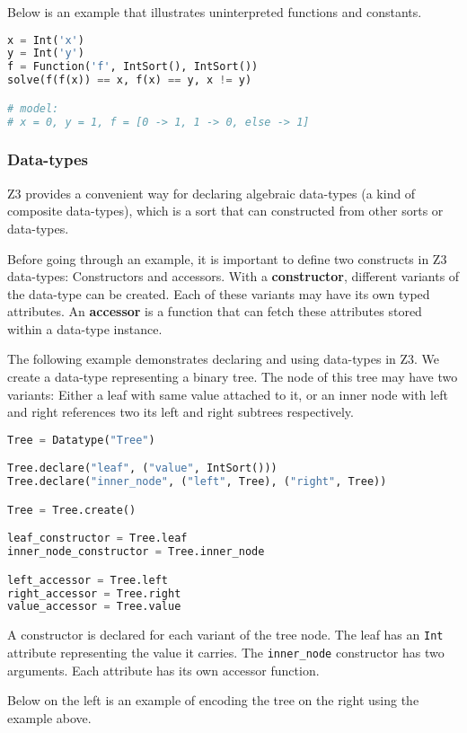 Below is an example that illustrates uninterpreted functions and constants.

\begin{lstlisting}[language=python]
x = Int('x')
y = Int('y')
f = Function('f', IntSort(), IntSort())
solve(f(f(x)) == x, f(x) == y, x != y)

# model:
# x = 0, y = 1, f = [0 -> 1, 1 -> 0, else -> 1]
\end{lstlisting}

\subsubsection{Data-types}
Z3 provides a convenient way for declaring algebraic data-types (a kind of composite data-types), which is a sort that can constructed from other sorts or data-types.

Before going through an example, it is important to define two constructs in Z3 data-types: Constructors and accessors. With a \textbf{constructor}, different variants of the data-type can be created. Each of these variants may have its own typed attributes. An \textbf{accessor} is a function that can fetch these attributes stored within a data-type instance.

The following example demonstrates declaring and using data-types in Z3. We create a data-type representing a binary tree. The node of this tree may have two variants: Either a leaf with same value attached to it, or an inner node with left and right references two its left and right subtrees respectively.

\begin{lstlisting}[language=python]
Tree = Datatype("Tree")

Tree.declare("leaf", ("value", IntSort()))
Tree.declare("inner_node", ("left", Tree), ("right", Tree))

Tree = Tree.create()

leaf_constructor = Tree.leaf
inner_node_constructor = Tree.inner_node

left_accessor = Tree.left
right_accessor = Tree.right
value_accessor = Tree.value
\end{lstlisting}

A constructor is declared for each variant of the tree node. The leaf has an \lstinline|Int| attribute representing the value it carries. The \lstinline|inner_node| constructor has two arguments. Each attribute has its own accessor function.

Below on the left is an example of encoding the tree on the right using the example above.


